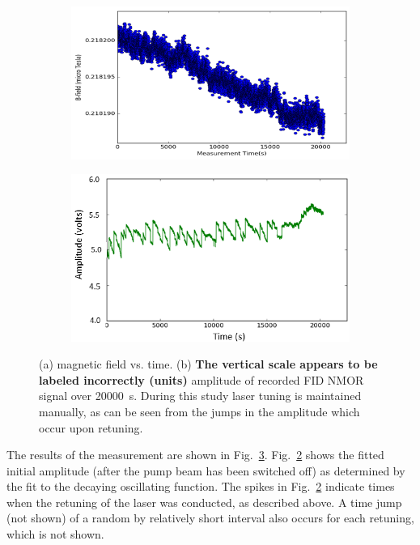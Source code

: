 \begin{figure}
  \centering
  \begin{subfigure}[b]{0.48\textwidth}
    \centering
    \includegraphics[width=\textwidth]{figures/manual_tuning}
    \caption{}
    \label{fig:field-manual-tuning}
  \end{subfigure}
  \hfill
  \begin{subfigure}[b]{0.48\textwidth}
    \centering
    \includegraphics[width=\textwidth]{figures/amplitude_manual_tuning}
    \caption{}
    \label{fig:amplitude-manual-tuning}
  \end{subfigure}
  \caption{(a) magnetic field vs. time. (b) {\bf The vertical scale
      appears to be labeled incorrectly (units)} amplitude of recorded
    FID NMOR signal over 20000~s. During this study laser tuning is
    maintained manually, as can be seen from the jumps in the
    amplitude which occur upon retuning.}
  \label{fig:manual-tuning}
\end{figure}
   
The results of the measurement are shown in
Fig.~\ref{fig:manual-tuning}.  Fig.~\ref{fig:amplitude-manual-tuning}
shows the fitted initial amplitude (after the pump beam has been
switched off) as determined by the fit to the decaying oscillating
function.  The spikes in Fig.~\ref{fig:amplitude-manual-tuning}
indicate times when the retuning of the laser was conducted, as
described above.  A time jump (not shown) of a random by relatively
short interval also occurs for each retuning, which is not shown.

